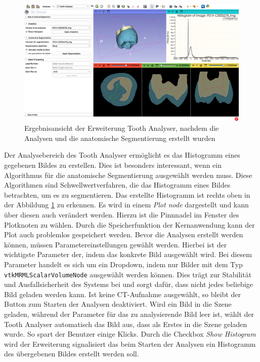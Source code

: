 \begin{figure}[h]
	\centering
	\includegraphics[scale=0.2, width=\textwidth]{img/toothAnalyserFullView.png}
	\caption{Ergebnisansicht der Erweiterung Tooth Analyser, nachdem die Analysen und
	die anatomische Segmentierung erstellt wurden}
	\label{fig:tooth_analyser_full_view}
\end{figure}

Der Analysebereich des Tooth Analyser ermöglicht es das Histogramm eines
gegebenen Bildes zu erstellen. Dies ist besonders interessant, wenn ein
Algorithmus für die anatomische Segmentierung ausgewählt werden muss. Diese Algorithmen
sind Schwellwertverfahren, die das Histogramm eines Bildes betrachten, um es zu segmentieren.
Das erstellte Histogramm ist rechts oben in der Abbildung
\ref{fig:tooth_analyser_full_view} zu erkennen. Es wird in einem \textit{Plot
node} dargestellt und kann über diesen auch verändert werden. Hierzu ist die Pinnnadel
im Fenster des Plotknoten zu wählen. Durch die Speicherfunktion der
Kernanwendung kann der Plot auch problemlos gespeichert werden. Bevor die Analysen
erstellt werden können, müssen Parametereinstellungen gewählt werden. Hierbei ist
der wichtigste Parameter der, indem das konkrete Bild ausgewählt wird. Bei diesem
Parameter handelt es sich um ein Dropdown, indem nur Bilder mit dem Typ \texttt{vtkMRMLScalarVolumeNode}
ausgewählt werden können. Dies trägt zur Stabilität und Ausfallsicherheit des
Systems bei und sorgt dafür, dass nicht jedes beliebige Bild geladen werden kann.
Ist keine \ac{CT}-Aufnahme ausgewählt, so bleibt der Button zum Starten der
Analysen deaktiviert. Wird ein Bild in die Szene geladen, während der Parameter
für das zu analysierende Bild leer ist, wählt der Tooth Analyser automatisch das
Bild aus, dass als Erstes in die Szene geladen wurde. So spart der Benutzer einige
Klicks. Durch die Checkbox \textit{Show Histogram} wird der Erweiterung signalisiert
das beim Starten der Analysen ein Histogramm des übergebenen Bildes erstellt werden
soll.

